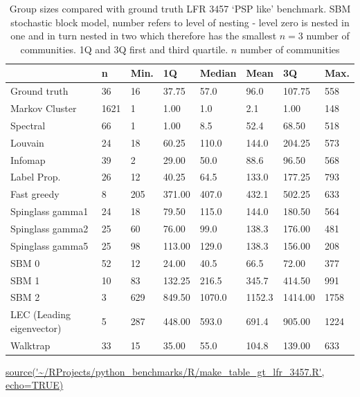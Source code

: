 \begin{table}[ht]
\centering
\setlength{\extrarowheight}{2pt}
\begin{tabular}{llllllll}
  \toprule
 & n & Min. & 1Q & Median & Mean & 3Q & Max. \\ 
  \midrule
Ground truth & 36 & 16 & 37.75 & 57.0 & 96.0 & 107.75 & 558 \\ 
Markov Cluster & 1621 & 1 & 1.00 & 1.0 & 2.1 & 1.00 & 148 \\ 
Spectral & 66 & 1 & 1.00 & 8.5 & 52.4 & 68.50 & 518 \\ 
 Louvain & 24 & 18 & 60.25 & 110.0 & 144.0 & 204.25 & 573 \\ 
 Infomap & 39 & 2 & 29.00 & 50.0 & 88.6 & 96.50 & 568 \\ 
 Label Prop. & 26 & 12 & 40.25 & 64.5 & 133.0 & 177.25 & 793 \\ 
 Fast greedy & 8 & 205 & 371.00 & 407.0 & 432.1 & 502.25 & 633 \\ 
 Spinglass gamma1 & 24 & 18 & 79.50 & 115.0 & 144.0 & 180.50 & 564 \\ 
 Spinglass gamma2 & 25 & 60 & 76.00 & 99.0 & 138.3 & 176.00 & 481 \\ 
 Spinglass gamma5 & 25 & 98 & 113.00 & 129.0 & 138.3 & 156.00 & 208 \\ 
 SBM 0 & 52 & 12 & 24.00 & 40.5 & 66.5 & 72.00 & 377 \\ 
 SBM 1 & 10 & 83 & 132.25 & 216.5 & 345.7 & 414.50 & 991 \\ 
 SBM 2 & 3 & 629 & 849.50 & 1070.0 & 1152.3 & 1414.00 & 1758 \\ 
 LEC (Leading eigenvector) & 5 & 287 & 448.00 & 593.0 & 691.4 & 905.00 & 1224 \\ 
 Walktrap & 33 & 15 & 35.00 & 55.0 & 104.8 & 139.00 & 633 \\ 
   \bottomrule
\end{tabular}
\caption{Group sizes compared with ground truth LFR 3457 `PSP like' benchmark. SBM stochastic block model, number refers to level of nesting - level zero is nested in one and in turn nested in two which therefore has the smallest $n=3$ number of communities. 1Q and 3Q first and third quartile. $n$ number of communities} 
\tiny\url{source('~/RProjects/python_benchmarks/R/make_table_gt_lfr_3457.R', echo=TRUE)}
\label{tab:Group sizes compared with ground truth LFR 3457 PSP like benchmark}
\end{table}






